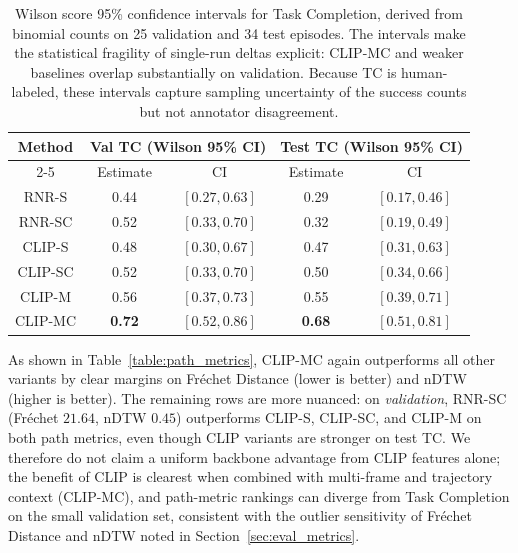 \begin{table}[ht]
\begin{center}
\begin{tabular}{|c|cc|cc|}
\hline
\multirow{2}{*}{Method} & \multicolumn{2}{c|}{Val TC (Wilson 95\% CI)} & \multicolumn{2}{c|}{Test TC (Wilson 95\% CI)} \\ \cline{2-5}
 & \multicolumn{1}{c|}{Estimate} & CI & \multicolumn{1}{c|}{Estimate} & CI \\ \hline
RNR-S   & \multicolumn{1}{c|}{0.44} & $[0.27,0.63]$ & \multicolumn{1}{c|}{0.29} & $[0.17,0.46]$ \\ \hline
RNR-SC  & \multicolumn{1}{c|}{0.52} & $[0.33,0.70]$ & \multicolumn{1}{c|}{0.32} & $[0.19,0.49]$ \\ \hline
CLIP-S  & \multicolumn{1}{c|}{0.48} & $[0.30,0.67]$ & \multicolumn{1}{c|}{0.47} & $[0.31,0.63]$ \\ \hline
CLIP-SC & \multicolumn{1}{c|}{0.52} & $[0.33,0.70]$ & \multicolumn{1}{c|}{0.50} & $[0.34,0.66]$ \\ \hline
CLIP-M  & \multicolumn{1}{c|}{0.56} & $[0.37,0.73]$ & \multicolumn{1}{c|}{0.55} & $[0.39,0.71]$ \\ \hline
CLIP-MC & \multicolumn{1}{c|}{\textbf{0.72}} & $[0.52,0.86]$ & \multicolumn{1}{c|}{\textbf{0.68}} & $[0.51,0.81]$ \\ \hline
\end{tabular}
\end{center}
\caption[Wilson CIs for Task Completion]{Wilson score 95\% confidence intervals for Task Completion, derived from binomial counts on 25 validation and 34 test episodes. The intervals make the statistical fragility of single-run deltas explicit: CLIP-MC and weaker baselines overlap substantially on validation. Because TC is human-labeled, these intervals capture sampling uncertainty of the success counts but not annotator disagreement.}
\label{table:tc_ci}
\end{table}

As shown in Table~\ref{table:path_metrics}, CLIP-MC again outperforms all other variants by clear margins on Fr\'{e}chet Distance (lower is better) and nDTW (higher is better). The remaining rows are more nuanced: on \emph{validation}, RNR-SC (Fr\'{e}chet $21.64$, nDTW $0.45$) outperforms CLIP-S, CLIP-SC, and CLIP-M on both path metrics, even though CLIP variants are stronger on test TC. We therefore do not claim a uniform backbone advantage from CLIP features alone; the benefit of CLIP is clearest when combined with multi-frame and trajectory context (CLIP-MC), and path-metric rankings can diverge from Task Completion on the small validation set, consistent with the outlier sensitivity of Fr\'{e}chet Distance and nDTW noted in Section~\ref{sec:eval_metrics}.


